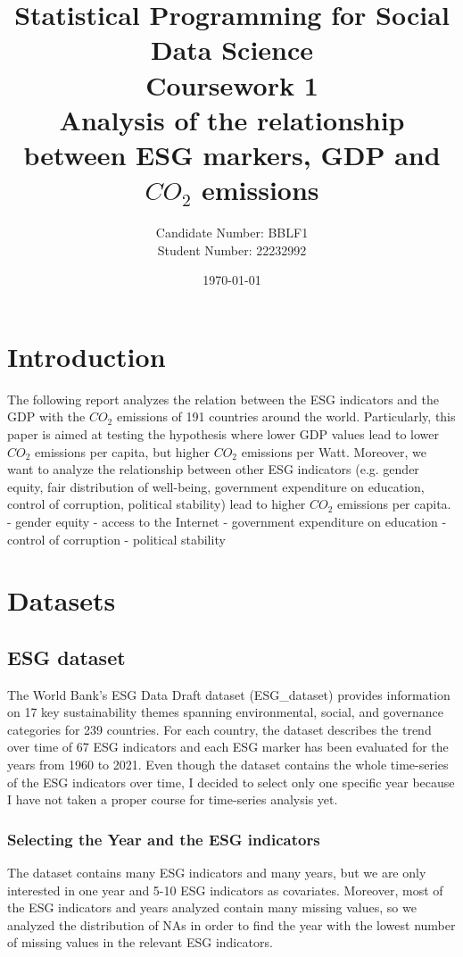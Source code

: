 \documentclass{article}
\title{\vspace{-30}Statistical Programming for Social Data Science\\Coursework 1\\Analysis of the relationship between ESG markers, GDP and $CO_2$ emissions}
\author{Candidate Number: BBLF1\\Student Number: 22232992}
\date{\vspace{-10}\today}
\begin{document}
	\maketitle
	\section{Introduction}
	The following report analyzes the relation between the ESG indicators and the GDP with the $CO_2$ emissions of 191 countries around the world.
	Particularly, this paper is aimed at testing the hypothesis where lower GDP values lead to lower $CO_2$ emissions per capita, but higher $CO_2$ emissions per Watt. Moreover, we want to analyze the relationship between other ESG indicators (e.g. gender equity, fair distribution of well-being, government expenditure on education, control of corruption, political stability) lead to higher $CO_2$ emissions per capita.
	- gender equity
	- access to the Internet
	- government expenditure on education
	- control of corruption
	- political stability
	
	\section{Datasets}
	\subsection{ESG dataset}
	The World Bank’s ESG Data Draft dataset (ESG\_dataset) provides information on 17 key sustainability themes spanning environmental, social, and governance categories for 239 countries. For each country, the dataset describes the trend over time of 67 ESG indicators and each ESG marker has been evaluated for the years from 1960 to 2021. 
	Even though the dataset contains the whole time-series of the ESG indicators over time, I decided to select only one specific year because I have not taken a proper course for time-series analysis yet. 

	\subsubsection{Selecting the Year and the ESG indicators} \label{sec:selecting_year_esg}
	The dataset contains many ESG indicators and many years, but we are only interested in one year and 5-10 ESG indicators as covariates. Moreover, most of the ESG indicators and years analyzed contain many missing values, so we analyzed the distribution of NAs in order to find the year with the lowest number of missing values in the relevant ESG indicators.
	
\end{document}
